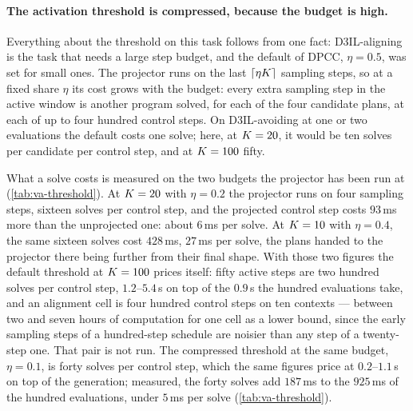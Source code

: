 \paragraph{The activation threshold is compressed, because the budget is high.}
Everything about the threshold on this task follows from one fact: D3IL-aligning is the task that needs a
large step budget, and the default of \ac{DPCC}, $\eta=0.5$, was set for small ones. The projector runs
on the last $\lceil \eta K \rceil$ sampling steps, so at a fixed share $\eta$ its cost grows with the
budget: every extra sampling step in the active window is another program solved, for each of the four
candidate plans, at each of up to four hundred control steps. On D3IL-avoiding at one or two evaluations
the default costs one solve; here, at $K=20$, it would be ten solves per candidate per control step,
and at $K=100$ fifty.

What a solve costs is measured on the two budgets the projector has been run at
(\autoref{tab:va-threshold}). At $K=20$ with $\eta=0.2$ the projector runs on four sampling steps,
sixteen solves per control step, and the projected control step costs $93$\,ms more than the unprojected
one: about $6$\,ms per solve. At $K=10$ with $\eta=0.4$, the same sixteen solves cost $428$\,ms,
$27$\,ms per solve, the plans handed to the projector there being further from their final shape. With
those two figures the default threshold at $K=100$ prices itself: fifty active steps are two hundred
solves per control step, $1.2$--$5.4$\,s on top of the $0.9$\,s the hundred evaluations take, and an
alignment cell is four hundred control steps on ten contexts --- between two and seven hours of computation
for one cell as a lower bound, since the early sampling steps of a hundred-step schedule are noisier than
any step of a twenty-step one. That pair is not run. The compressed threshold at the same budget,
$\eta=0.1$, is forty solves per control step, which the same figures price at $0.2$--$1.1$\,s on top of the
generation; measured, the forty solves add $187$\,ms to the $925$\,ms of the hundred evaluations, under
$5$\,ms per solve (\autoref{tab:va-threshold}).

